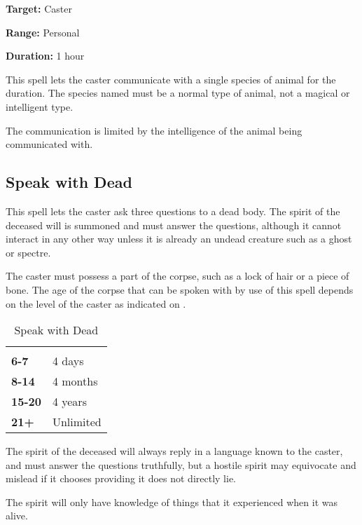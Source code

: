 \begin{multicols*}{2}
{\textbf{Target:} Caster

\textbf{Range:} Personal

\textbf{Duration:} 1 hour}

This spell lets the caster communicate with a single species of animal for the duration. The species named must be a normal type of animal, not a magical or intelligent type.

The communication is limited by the intelligence of the animal being communicated with.

\subsection{Speak with Dead}\label{spell:Speak with Dead}

This spell lets the caster ask three questions to a dead body. The spirit of the deceased will is summoned and must answer the questions, although it cannot interact in any other way unless it is already an undead creature such as a ghost or spectre.

The caster must possess a part of the corpse, such as a lock of hair or a piece of bone. The age of the corpse that can be spoken with by use of this spell depends on the level of the caster as indicated on .

\begin {table}[H]
  \caption{Speak with Dead}\label{tab:Speak with Dead}
  \begin{tabularx}{\columnwidth}{>{\bfseries}YY}
	 & \\
	6-7 & 4 days\\
	8-14 & 4 months\\
	15-20 & 4 years\\
	21+ & Unlimited
  \end {tabularx}
\end {table}

The spirit of the deceased will always reply in a language known to the caster, and must answer the questions truthfully, but a hostile spirit may equivocate and mislead if it chooses providing it does not directly lie.

The spirit will only have knowledge of things that it experienced when it was alive.


\end{multicols*}
